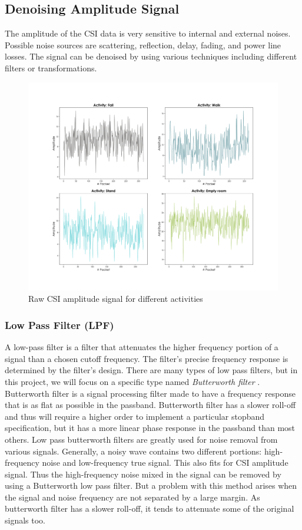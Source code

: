 \subsection{Denoising Amplitude Signal}
The amplitude of the CSI data is very sensitive to internal and external noises. Possible noise sources are scattering, reflection, delay, fading, and power line losses. The signal can be denoised by using various techniques including different filters or transformations.

\begin{figure}[H]
\centering
\includegraphics[width=1.0\textwidth, trim={0 3cm 0 2cm},clip]{./figure/chap 4/magnitude_plot_raw.png}
\caption{Raw CSI amplitude signal for different activities}
\label{Fig 4.13}
\end{figure}

\subsubsection{Low Pass Filter (LPF)}
A low-pass filter is a filter that attenuates the higher frequency portion of a signal than a chosen cutoff frequency. The filter's precise frequency response is determined by the filter's design. There are many types of low pass filters, but in this project, we will focus on a specific type named \emph{Butterworth filter} \cite{butterworth1930theory}. Butterworth filter is a signal processing filter made to have a frequency response that is as flat as possible in the passband.  Butterworth filter has a slower roll-off and thus will require a higher order to implement a particular stopband specification, but it has a more linear phase response in the passband than most others. Low pass butterworth filters are greatly used for noise removal from various signals. Generally, a noisy wave contains two different portions: high-frequency noise and low-frequency true signal. This also fits for CSI amplitude signal. Thus the high-frequency noise mixed in the signal can be removed by using a Butterworth low pass filter. But a problem with this method arises when the signal and noise frequency are not separated by a large margin. As butterworth filter has a slower roll-off, it tends to attenuate some of the original signals too. 


